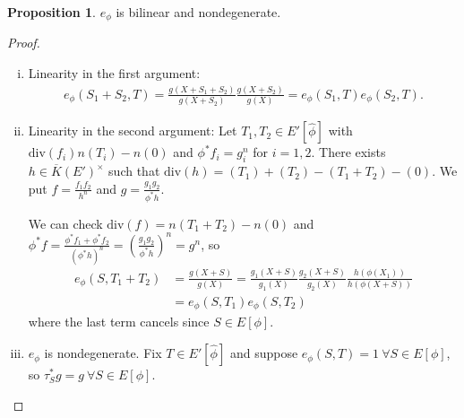 \documentclass{article}
\theoremstyle{definition}
\newtheorem{prop}[theorem]{Proposition}
\begin{document}
\begin{prop}\label{prop14.5}
    $e_\phi$ is bilinear and nondegenerate.
\end{prop}
\begin{proof}
    \begin{enumerate}[(i)]
        \item Linearity in the first argument:
        \begin{align*}
            e_\phi(S_1+S_2,T) = \frac{g(X+S_1+S_2)}{g(X+S_2)}\frac{g(X+S_2)}{g(X)} =e_\phi(S_1,T)e_\phi(S_2,T).
        \end{align*}
        \item Linearity in the second argument: Let $T_1,T_2 \in E'[\widehat{\phi}]$ with $\text{div}(f_i)n(T_i)-n(0)$ and $\phi^* f_i = g_i^n$ for $i=1,2$. There exists $h \in \overline{K}(E')^\times$ such that $\text{div}(h)=(T_1)+(T_2)-(T_1+T_2)-(0)$. We put $f = \frac{f_1f_2}{h^n}$ and $g = \frac{g_1g_2}{\phi^*h}$.
        \vspace{1mm}
         
        We can check $\text{div}(f) = n(T_1+T_2)-n(0)$ and $\phi^* f = \frac{\phi^* f_1 + \phi^* f_2}{(\phi^* h)^n} = \left(\frac{g_1g_2}{\phi^* h}\right)^n = g^n$, so 
        \begin{align*}
            e_{\phi}(S,T_1+T_2) &= \frac{g(X+S)}{g(X)} = \frac{g_1(X+S)}{g_1(X)}\frac{g_2(X+S)}{g_2(X)}\frac{h(\phi(X_1))}{h(\phi(X+S))} \\&= e_\phi(S,T_1)e_{\phi}(S,T_2)
        \end{align*}
        where the last term cancels since $S \in E[\phi]$.
        \item $e_\phi$ is nondegenerate. Fix $T \in E'[\widehat{\phi}]$ and suppose $e_\phi(S,T)=1 ~\forall S \in E[\phi]$, so $\tau_S^*g = g ~\forall S \in E[\phi]$.
    \end{enumerate}
\end{proof}
\end{document}
